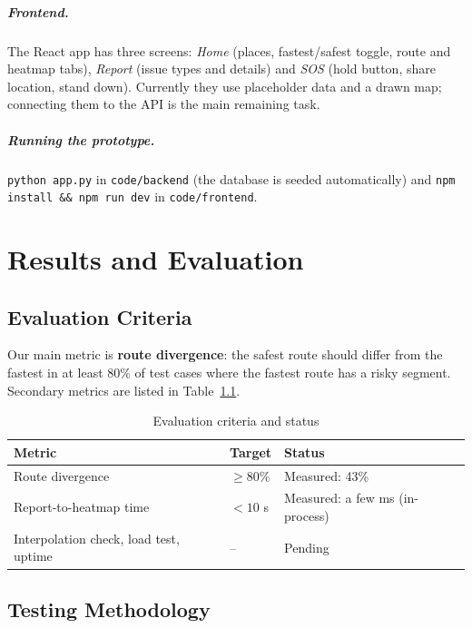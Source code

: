 \documentclass{tietreport}
\begin{document}
\paragraph{Frontend.} The React app has three screens: \emph{Home}
(places, fastest/safest toggle, route and heatmap tabs), \emph{Report}
(issue types and details) and \emph{SOS} (hold button, share location,
stand down). Currently they use placeholder data and a drawn map;
connecting them to the API is the main remaining task.

\paragraph{Running the prototype.} \texttt{python app.py} in
\texttt{code/backend} (the database is seeded automatically) and
\texttt{npm install \&\& npm run dev} in \texttt{code/frontend}.

\chapter{Results and Evaluation}

\section{Evaluation Criteria}

Our main metric is \textbf{route divergence}: the safest route should
differ from the fastest in at least 80\% of test cases where the fastest
route has a risky segment. Secondary metrics are listed in
Table~\ref{tab:criteria}.

\begin{table}[h]
\centering
\small
\begin{tabular}{|p{5cm}|l|p{5cm}|}
  \hline
  \textbf{Metric} & \textbf{Target} & \textbf{Status} \\ \hline
  Route divergence & $\ge 80\%$ & Measured: 43\% \\ \hline
  Report-to-heatmap time & $< 10$ s & Measured: a few ms (in-process) \\ \hline
  Interpolation check, load test, uptime & -- & Pending \\ \hline
\end{tabular}
\caption{Evaluation criteria and status}
\label{tab:criteria}
\end{table}

\section{Testing Methodology}
\end{document}
